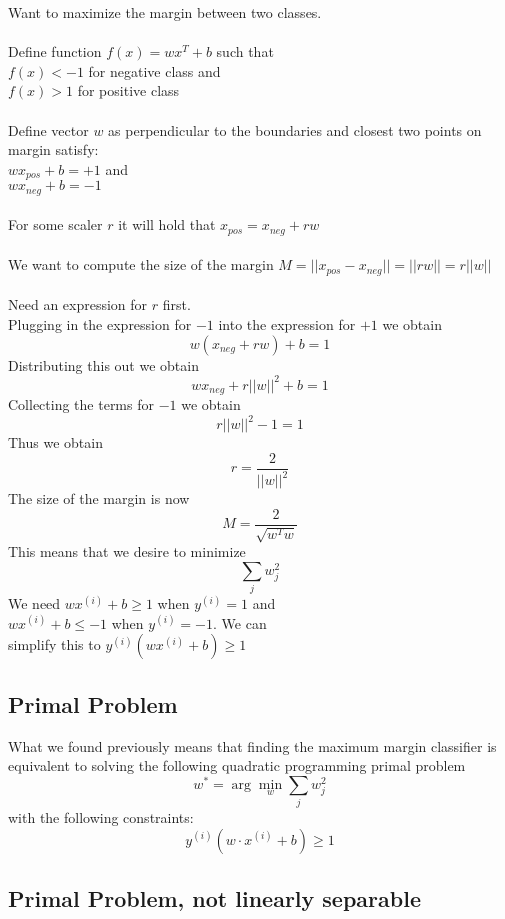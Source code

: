 \documentclass[twoside,11pt]{article}
\theoremstyle{definition}
\begin{document}
Want to maximize the margin between two classes. \\
\\
Define function $f(x) = wx^T + b$ such that \\
$f(x)<-1$ for negative class and \\
$f(x)>1$ for positive class\\
\\
Define vector $w$ as perpendicular to the boundaries and closest two points on margin satisfy: \\
$w x_{pos} + b= +1$ and \\
$w x_{neg} + b = -1$\\
\\
For some scaler $r$ it will hold that $x_{pos} = x_{neg} + rw$\\
\\
We want to compute the size of the margin $M=||x_{pos}-x_{neg}|| = ||rw|| = r||w||$\\
\\
Need an expression for $r$ first.\\
Plugging in the expression for $-1$ into the expression for $+1$ we obtain
\[
w(x_{neg} + rw) + b = 1
\] 
Distributing this out we obtain
\[
w x_{neg} + r ||w||^2 + b = 1
\]
Collecting the terms for $-1$ we obtain
\[
r ||w||^2 - 1 = 1
\]
Thus we obtain
\[
r = \frac{2}{||w||^2}
\]
The size of the margin is now
\[
M = \frac{2}{\sqrt{w^Tw}}
\]
This means that we desire to minimize
\[
\sum_{j} w_j^2
\]
We need $w x^{(i)} + b \geq 1$ when $y^{(i)}=1$ and \\
$w x^{(i)} + b \leq -1$ when $y^{(i)}=-1$. We can\\
simplify this to $y^{(i)} (w x^{(i)} + b) \geq 1$

\newpage

\subsection{Primal Problem}

What we found previously means that finding the maximum margin classifier is equivalent to solving the following quadratic programming primal problem
\[
w^{*} = \arg \min_{w} \sum_j w_j^2
\]
with the following constraints:
\[
y^{(i)} ( w \cdot x^{(i)} + b) \geq 1
\]

\subsection{Primal Problem, not linearly separable}
\end{document}
